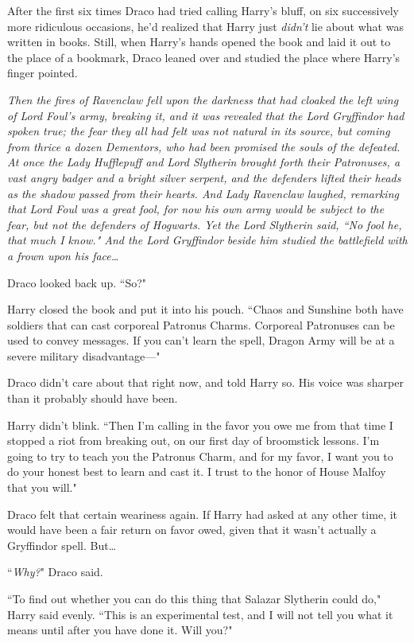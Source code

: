 After the first six times Draco had tried calling Harry's bluff, on six successively more ridiculous occasions, he'd realized that Harry just \emph{didn't} lie about what was written in books. Still, when Harry's hands opened the book and laid it out to the place of a bookmark, Draco leaned over and studied the place where Harry's finger pointed.

\emph{Then the fires of Ravenclaw fell upon the darkness that had cloaked the left wing of Lord Foul's army, breaking it, and it was revealed that the Lord Gryffindor had spoken true; the fear they all had felt was not natural in its source, but coming from thrice a dozen Dementors, who had been promised the souls of the defeated. At once the Lady Hufflepuff and Lord Slytherin brought forth their Patronuses, a vast angry badger and a bright silver serpent, and the defenders lifted their heads as the shadow passed from their hearts. And Lady Ravenclaw laughed, remarking that Lord Foul was a great fool, for now his own army would be subject to the fear, but not the defenders of Hogwarts. Yet the Lord Slytherin said, ``No fool he, that much I know." And the Lord Gryffindor beside him studied the battlefield with a frown upon his face{\ldots}}

Draco looked back up. ``So?"

Harry closed the book and put it into his pouch. ``Chaos and Sunshine both have soldiers that can cast corporeal Patronus Charms. Corporeal Patronuses can be used to convey messages. If you can't learn the spell, Dragon Army will be at a severe military disadvantage—"

Draco didn't care about that right now, and told Harry so. His voice was sharper than it probably should have been.

Harry didn't blink. ``Then I'm calling in the favor you owe me from that time I stopped a riot from breaking out, on our first day of broomstick lessons. I'm going to try to teach you the Patronus Charm, and for my favor, I want you to do your honest best to learn and cast it. I trust to the honor of House Malfoy that you will."

Draco felt that certain weariness again. If Harry had asked at any other time, it would have been a fair return on favor owed, given that it wasn't actually a Gryffindor spell. But{\ldots}

``\emph{Why?}" Draco said.

``To find out whether you can do this thing that Salazar Slytherin could do," Harry said evenly. ``This is an experimental test, and I will not tell you what it means until after you have done it. Will you?"

